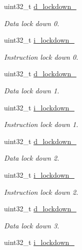 \begin{DoxyCompactItemize}
uint32\+\_\+t \mbox{\hyperlink{group__L2C-310__cache_gaf81d78e32e50e190e09fd68a81d94534}{d\+\_\+lockdown\+\_}}
\begin{DoxyCompactList}\small\item\em Data lock down 0. \end{DoxyCompactList}\item 
uint32\+\_\+t \mbox{\hyperlink{group__L2C-310__cache_ga4366107602484bef03795217266aa2fd}{i\+\_\+lockdown\+\_}}
\begin{DoxyCompactList}\small\item\em Instruction lock down 0. \end{DoxyCompactList}\item 
uint32\+\_\+t \mbox{\hyperlink{group__L2C-310__cache_ga9953a90044bbf4d4c82edb808c39c92b}{d\+\_\+lockdown\+\_}}
\begin{DoxyCompactList}\small\item\em Data lock down 1. \end{DoxyCompactList}\item 
uint32\+\_\+t \mbox{\hyperlink{group__L2C-310__cache_gaa4d38e12efdbf846f5d1289662f10e50}{i\+\_\+lockdown\+\_}}
\begin{DoxyCompactList}\small\item\em Instruction lock down 1. \end{DoxyCompactList}\item 
uint32\+\_\+t \mbox{\hyperlink{group__L2C-310__cache_ga1dc85c087af0f05fc3982c2f12ff8e6c}{d\+\_\+lockdown\+\_}}
\begin{DoxyCompactList}\small\item\em Data lock down 2. \end{DoxyCompactList}\item 
uint32\+\_\+t \mbox{\hyperlink{group__L2C-310__cache_ga11941e82327f11fb2662f2f4f1a8ce9a}{i\+\_\+lockdown\+\_}}
\begin{DoxyCompactList}\small\item\em Instruction lock down 2. \end{DoxyCompactList}\item 
uint32\+\_\+t \mbox{\hyperlink{group__L2C-310__cache_ga97888702f6042fd87a0ea5766eaa56e1}{d\+\_\+lockdown\+\_}}
\begin{DoxyCompactList}\small\item\em Data lock down 3. \end{DoxyCompactList}\item 
uint32\+\_\+t \mbox{\hyperlink{group__L2C-310__cache_ga1196edfa74583fe6126e699cf7d6cad1}{i\+\_\+lockdown\+\_}}

\end{DoxyCompactItemize}
